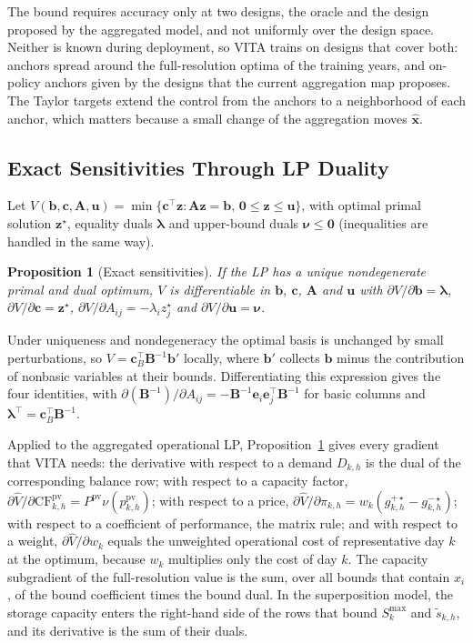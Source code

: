 \documentclass[journal]{IEEEtran}
\newtheorem{proposition}{Proposition}
\begin{document}
The bound requires accuracy only at two designs, the oracle and the design proposed by the aggregated model, and not uniformly over the design space. Neither is known during deployment, so VITA trains on designs that cover both: anchors spread around the full-resolution optima of the training years, and on-policy anchors given by the designs that the current aggregation map proposes. The Taylor targets extend the control from the anchors to a neighborhood of each anchor, which matters because a small change of the aggregation moves $\hat{\bm{x}}$.

\subsection{Exact Sensitivities Through LP Duality}
Let $V(\bm{b},\bm{c},\bm{A},\bm{u})=\min\{\bm{c}^{\top}\bm{z}:\bm{A}\bm{z}=\bm{b},\,\bm{0}\le\bm{z}\le\bm{u}\}$, with optimal primal solution $\bm{z}^{\star}$, equality duals $\bm{\lambda}$ and upper-bound duals $\bm{\nu}\le\bm{0}$ (inequalities are handled in the same way).

\begin{proposition}[Exact sensitivities]\label{prop:sens}
If the LP has a unique nondegenerate primal and dual optimum, $V$ is differentiable in $\bm{b}$, $\bm{c}$, $\bm{A}$ and $\bm{u}$ with $\partial V/\partial\bm{b}=\bm{\lambda}$, $\partial V/\partial\bm{c}=\bm{z}^{\star}$, $\partial V/\partial A_{ij}=-\lambda_i z^{\star}_j$ and $\partial V/\partial\bm{u}=\bm{\nu}$.
\end{proposition}
\begin{IEEEproof}
Under uniqueness and nondegeneracy the optimal basis is unchanged by small perturbations, so $V=\bm{c}_B^{\top}\bm{B}^{-1}\bm{b}'$ locally, where $\bm{b}'$ collects $\bm{b}$ minus the contribution of nonbasic variables at their bounds. Differentiating this expression gives the four identities, with $\partial(\bm{B}^{-1})/\partial A_{ij}=-\bm{B}^{-1}\bm{e}_i\bm{e}_j^{\top}\bm{B}^{-1}$ for basic columns and $\bm{\lambda}^{\top}=\bm{c}_B^{\top}\bm{B}^{-1}$.
\end{IEEEproof}

Applied to the aggregated operational LP, Proposition~\ref{prop:sens} gives every gradient that VITA needs: the derivative with respect to a demand $D_{k,h}$ is the dual of the corresponding balance row; with respect to a capacity factor, $\partial\hat{V}/\partial\mathrm{CF}^{\mathrm{pv}}_{k,h}=P^{\mathrm{pv}}\nu(p^{\mathrm{pv}}_{k,h})$; with respect to a price, $\partial\hat{V}/\partial\pi_{k,h}=w_k(g^{+\star}_{k,h}-g^{-\star}_{k,h})$; with respect to a coefficient of performance, the matrix rule; and with respect to a weight, $\partial\hat{V}/\partial w_k$ equals the unweighted operational cost of representative day $k$ at the optimum, because $w_k$ multiplies only the cost of day $k$. The capacity subgradient of the full-resolution value is the sum, over all bounds that contain $x_i$, of the bound coefficient times the bound dual. In the superposition model, the storage capacity enters the right-hand side of the rows that bound $S^{\max}_k$ and $\tilde{s}_{k,h}$, and its derivative is the sum of their duals.
\end{document}
